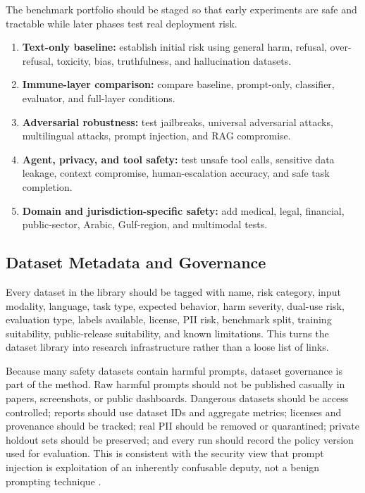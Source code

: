 \documentclass[11pt]{article}
\begin{document}
The benchmark portfolio should be staged so that early experiments are safe and tractable while later phases test real deployment risk.

\begin{enumerate}
  \item \textbf{Text-only baseline:} establish initial risk using general harm, refusal, over-refusal, toxicity, bias, truthfulness, and hallucination datasets.
  \item \textbf{Immune-layer comparison:} compare baseline, prompt-only, classifier, evaluator, and full-layer conditions.
  \item \textbf{Adversarial robustness:} test jailbreaks, universal adversarial attacks, multilingual attacks, prompt injection, and RAG compromise.
  \item \textbf{Agent, privacy, and tool safety:} test unsafe tool calls, sensitive data leakage, context compromise, human-escalation accuracy, and safe task completion.
  \item \textbf{Domain and jurisdiction-specific safety:} add medical, legal, financial, public-sector, Arabic, Gulf-region, and multimodal tests.
\end{enumerate}

\subsection{Dataset Metadata and Governance}

Every dataset in the library should be tagged with name, risk category, input modality, language, task type, expected behavior, harm severity, dual-use risk, evaluation type, labels available, license, PII risk, benchmark split, training suitability, public-release suitability, and known limitations. This turns the dataset library into research infrastructure rather than a loose list of links.

Because many safety datasets contain harmful prompts, dataset governance is part of the method. Raw harmful prompts should not be published casually in papers, screenshots, or public dashboards. Dangerous datasets should be access controlled; reports should use dataset IDs and aggregate metrics; licenses and provenance should be tracked; real PII should be removed or quarantined; private holdout sets should be preserved; and every run should record the policy version used for evaluation. This is consistent with the security view that prompt injection is exploitation of an inherently confusable deputy, not a benign prompting technique \citep{ncsc2023promptinjection,owasp2025genai}.
\end{document}
